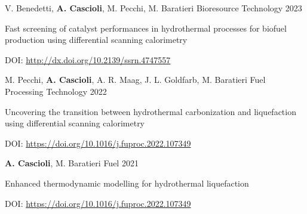 

\begin{cventries}

  \cventry
  {V. Benedetti, \textbf{A. Cascioli}, M. Pecchi, M. Baratieri} %
  {Bioresource Technology} %
  {} %
  {2023} %
  {
    \begin{cvitems} %
      \item {Fast screening of catalyst performances in hydrothermal processes for biofuel production using differential scanning calorimetry}
      \item {DOI: \href{http://dx.doi.org/10.2139/ssrn.4747557}{http://dx.doi.org/10.2139/ssrn.4747557}}
    \end{cvitems} %
  }


  \cventry
  {M. Pecchi, \textbf{A. Cascioli}, A. R. Maag, J. L. Goldfarb, M. Baratieri} %
  {Fuel Processing Technology} %
  {} %
  {2022} %
  {
    \begin{cvitems} %
      \item {Uncovering the transition between hydrothermal carbonization and liquefaction using differential scanning calorimetry}
      \item {DOI: \href{https://doi.org/10.1016/j.fuproc.2022.107349}{https://doi.org/10.1016/j.fuproc.2022.107349}}
    \end{cvitems} %
  }


  \cventry
  {\textbf{A. Cascioli}, M. Baratieri} %
  {Fuel} %
  {} %
  {2021} %
  {
    \begin{cvitems} %
      \item {Enhanced thermodynamic modelling for hydrothermal liquefaction}
      \item {DOI: \href{https://doi.org/10.1016/j.fuproc.2022.107349}{https://doi.org/10.1016/j.fuproc.2022.107349}}
    \end{cvitems} %
  }


\end{cventries}
